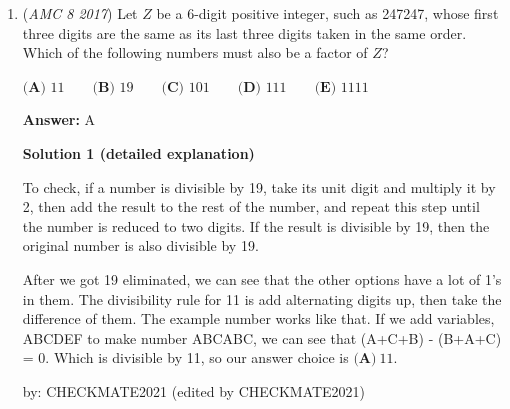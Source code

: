 \begin{enumerate}
 $\textbf{(A) }18\qquad\textbf{(B) }36\qquad\textbf{(C) }60\qquad\textbf{(D) }72\qquad\textbf{(E) }90$

 \textbf{Answer: }D



\textbf{Solution 1}

The sum of the ratios is $10$.  Since the sum of the angles of a triangle is $180^{\circ}$, the ratio can be scaled up to $54:54:72$ $(3\cdot 18:3\cdot 18:4\cdot 18).$  The numbers in the ratio $54:54:72$ represent the angles of the triangle.  The question asks for the largest, so the answer is $\boxed{\textbf{(D) }72}$.

 



\textbf{Solution 2}

We can denote the angles of the triangle as $3x$, $3x$, $4x$. Due to the sum of the angles in a triangle, $3x+3x+4x=180^{\circ}\implies x=18^{\circ}$. The greatest angle is $4x$ and after substitution we get $\boxed{\textbf{(D) }72}$.

 


	\item (\textit{AMC 8 2017}) Let $Z$ be a 6-digit positive integer, such as 247247, whose first three digits are the same as its last three digits taken in the same order. Which of the following numbers must also be a factor of $Z$?


 $\textbf{(A) }11\qquad\textbf{(B) }19\qquad\textbf{(C) }101\qquad\textbf{(D) }111\qquad\textbf{(E) }1111$

 \textbf{Answer: }A



\textbf{Solution 1 (detailed explanation)}

To check, if a number is divisible by 19, take its unit digit and multiply it by 2, then add the result to the rest of the number, and repeat this step until the number is reduced to two digits. If the result is divisible by 19, then the original number is also divisible by 19.

 After we got 19 eliminated, we can see that the other options have a lot of 1's in them. The divisibility rule for 11 is add alternating digits up, then take the difference of them. The example number works like that. If we add variables, ABCDEF to make number ABCABC, we can see that (A+C+B) - (B+A+C) = 0. Which is divisible by 11, so our answer choice is $\boxed{\textbf{(A)}\ 11}$.

 by: CHECKMATE2021 (edited by CHECKMATE2021)


\end{enumerate}
